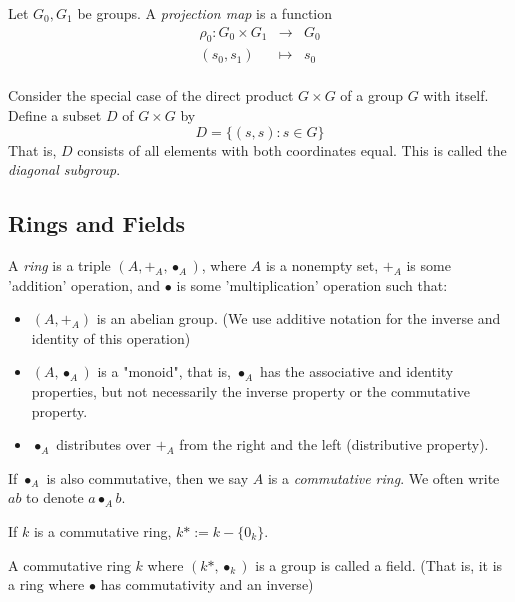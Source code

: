\documentclass[a5paper]{article}
\begin{document}
\begin{definition*}
Let $G_0, G_1$ be groups. A \emph{projection map} is a function 
\[
\begin{array}{rcl}
\rho_0:G_0\times G_1 &\to& G_0\\
(s_0,s_1) &\mapsto& s_0\\
\end{array}
\]
\end{definition*}

\begin{definition*}
Consider the special case of the direct product $G\times G$ of a group $G$ with itself. Define a subset $D$ of $G\times G$ by 
$$D=\{(s,s):s\in G\}$$
That is, $D$ consists of all elements with both coordinates equal. This is called the \emph{diagonal subgroup}.
\end{definition*}

\subsection{Rings and Fields}

\begin{definition*}
A \emph{ring} is a triple $(A, +_A, \bullet_A)$, where $A$ is a nonempty set, $+_A$ is some 'addition' operation, and $\bullet$ is some 'multiplication' operation such that:
\begin{itemize}
\item $(A, +_A)$ is an abelian group. (We use additive notation for the inverse and identity of this operation)
\item $(A, \bullet_A)$ is a "monoid", that is, $\bullet_A$ has the associative and identity properties, but not necessarily the inverse property or the commutative property. 
\item $\bullet_A$ distributes over $+_A$ from the right and the left (distributive property).
\end{itemize}
\end{definition*}

\begin{definition*}
If $\bullet_A$ is also commutative, then we say $A$ is a \emph{commutative ring}. We often write $ab$ to denote $a\bullet_A b$.
\end{definition*}

If $k$ is a commutative ring, $k* := k-\{0_k\}$.

\begin{definition*}
A commutative ring $k$ where $(k*, \bullet_k)$ is a group is called a field.  (That is, it is a ring where $\bullet$ has commutativity and an inverse)
\end{definition*}
\end{document}
